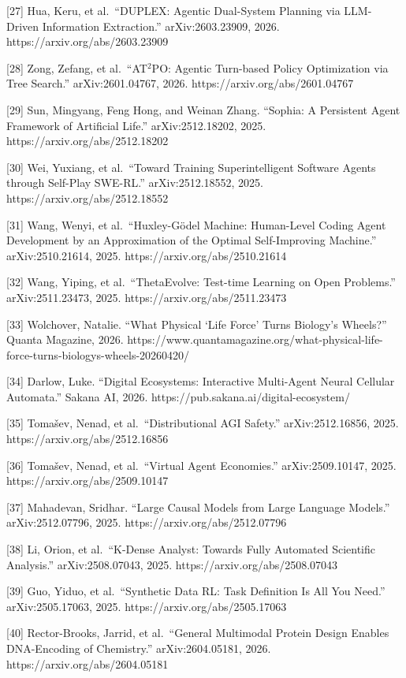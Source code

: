 {[}27{]} Hua, Keru, et al.~``DUPLEX: Agentic Dual-System Planning via
LLM-Driven Information Extraction.'' arXiv:2603.23909, 2026.
https://arxiv.org/abs/2603.23909

{[}28{]} Zong, Zefang, et al.~``AT\(^2\)PO: Agentic Turn-based Policy
Optimization via Tree Search.'' arXiv:2601.04767, 2026.
https://arxiv.org/abs/2601.04767

{[}29{]} Sun, Mingyang, Feng Hong, and Weinan Zhang. ``Sophia: A
Persistent Agent Framework of Artificial Life.'' arXiv:2512.18202, 2025.
https://arxiv.org/abs/2512.18202

{[}30{]} Wei, Yuxiang, et al.~``Toward Training Superintelligent
Software Agents through Self-Play SWE-RL.'' arXiv:2512.18552, 2025.
https://arxiv.org/abs/2512.18552

{[}31{]} Wang, Wenyi, et al.~``Huxley-Gödel Machine: Human-Level Coding
Agent Development by an Approximation of the Optimal Self-Improving
Machine.'' arXiv:2510.21614, 2025. https://arxiv.org/abs/2510.21614

{[}32{]} Wang, Yiping, et al.~``ThetaEvolve: Test-time Learning on Open
Problems.'' arXiv:2511.23473, 2025. https://arxiv.org/abs/2511.23473

{[}33{]} Wolchover, Natalie. ``What Physical `Life Force' Turns
Biology's Wheels?'' Quanta Magazine, 2026.
https://www.quantamagazine.org/what-physical-life-force-turns-biologys-wheels-20260420/

{[}34{]} Darlow, Luke. ``Digital Ecosystems: Interactive Multi-Agent
Neural Cellular Automata.'' Sakana AI, 2026.
https://pub.sakana.ai/digital-ecosystem/

{[}35{]} Tomašev, Nenad, et al.~``Distributional AGI Safety.''
arXiv:2512.16856, 2025. https://arxiv.org/abs/2512.16856

{[}36{]} Tomašev, Nenad, et al.~``Virtual Agent Economies.''
arXiv:2509.10147, 2025. https://arxiv.org/abs/2509.10147

{[}37{]} Mahadevan, Sridhar. ``Large Causal Models from Large Language
Models.'' arXiv:2512.07796, 2025. https://arxiv.org/abs/2512.07796

{[}38{]} Li, Orion, et al.~``K-Dense Analyst: Towards Fully Automated
Scientific Analysis.'' arXiv:2508.07043, 2025.
https://arxiv.org/abs/2508.07043

{[}39{]} Guo, Yiduo, et al.~``Synthetic Data RL: Task Definition Is All
You Need.'' arXiv:2505.17063, 2025. https://arxiv.org/abs/2505.17063

{[}40{]} Rector-Brooks, Jarrid, et al.~``General Multimodal Protein
Design Enables DNA-Encoding of Chemistry.'' arXiv:2604.05181, 2026.
https://arxiv.org/abs/2604.05181

